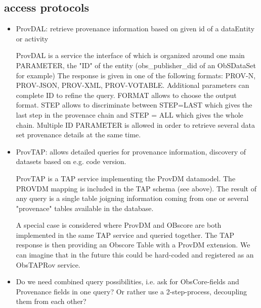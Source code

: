 \subsection{access protocols}
\begin{itemize}
\item ProvDAL: retrieve provenance information based on given id of a dataEntity or activity

ProvDAL is a service the interface of which is organized around one main PARAMETER, the "ID" of the entity (obs\_publisher\_did of an ObSDataSet for example) The response is given in one of the following formats: PROV-N, PROV-JSON, PROV-XML, PROV-VOTABLE. Additional parameters can complete ID to refine the query. FORMAT allows to choose the output format. STEP allows to discriminate between STEP=LAST which gives the last step in the provenace chain and STEP = ALL which gives the whole chain.
Multiple ID PARAMETER is allowed in order to retrieve several data set provenance details at the same time.
\item ProvTAP: allows detailed queries for provenance information, discovery of datasets based on 
e.g. code version.

ProvTAP is a TAP service implementing the ProvDM datamodel. The PROVDM  mapping is included in the TAP schema (see above). The result of any query is a single table joigning information coming from one or several "provenace" tables available in the database. 

A special case is considered where ProvDM and OBscore are both implemented in the same TAP service and queried together. The TAP response is then providing an Obscore Table with a ProvDM extension. We can imagine that in the future this could be hard-coded and registered as an ObsTAPRov service. 


\item Do we need combined query possibilities, i.e. ask for ObsCore-fields and Provenance fields
in one query? Or rather use a 2-step-process, decoupling them from each other?
\end{itemize}


